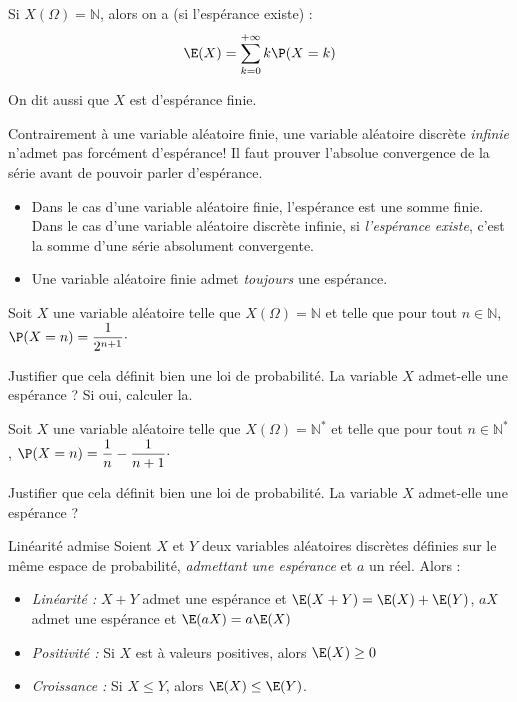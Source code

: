 \documentclass[french,11pt,twoside]{VcCours}
\begin{document}
Si $X(\Omega)= \mathbb{N}$, alors on a (si l'espérance existe) :
$$\E(X) = \sum\limits_{k=0}^{+\infty} k \P(X=k)$$

\newpage

\begin{Remarque}{} On dit aussi que $X$ est d'espérance finie.
\end{Remarque}

\medskip

\begin{Remarque}[\alerte]{} Contrairement à une variable aléatoire finie, une variable aléatoire discrète \emph{infinie} n'admet pas forcément d'espérance! Il faut prouver l'absolue convergence de la série avant de pouvoir parler d'espérance. 
\end{Remarque}

\medskip

\begin{Remarques}{}
\begin{itemize}
\item Dans le cas d'une variable aléatoire finie, l'espérance est une somme finie. Dans le cas d'une variable aléatoire discrète infinie, si \emph{l'espérance existe}, c'est la somme d'une série absolument convergente.
\item Une variable aléatoire finie admet \emph{toujours} une espérance.
\end{itemize}
\end{Remarques}

\begin{Exemple}{} Soit $X$ une variable aléatoire telle que $X(\Omega) = \mathbb{N}$ et telle que pour tout $n \in \mathbb{N}$, $\P(X=n)= \dfrac{1}{2^{n+1}} \cdot$

Justifier que cela définit bien une loi de probabilité. La variable $X$ admet-elle une espérance ? Si oui, calculer la.

\vspace{11.3cm}
\end{Exemple}

\begin{ApplicationDirecte}{} Soit $X$ une variable aléatoire telle que $X(\Omega) = \mathbb{N}^*$ et telle que pour tout $n \in \mathbb{N}^*$, $\P(X=n)= \dfrac{1}{n}- \dfrac{1}{n+1} \cdot$

Justifier que cela définit bien une loi de probabilité. La variable $X$ admet-elle une espérance ? 
\end{ApplicationDirecte}

\begin{Proposition}{Linéarité admise}
Soient $X$ et $Y$ deux variables aléatoires discrètes définies sur le même espace de probabilité, \emph{admettant une espérance} et $a$ un réel. Alors : 
\begin{itemize}
\item \emph{Linéarité :} $X+Y$ admet une espérance et $\E(X+Y) = \E(X)+\E(Y)$, $aX$ admet une espérance et $\E(aX)=a \E(X)$
\item \emph{Positivité :} Si $X$ est à valeurs positives, alors $\E(X) \geq 0 $
\item \emph{Croissance :} Si $X \le Y$, alors $\E(X) \leq \E(Y)$.
\end{itemize}
\end{Proposition}
\end{document}
